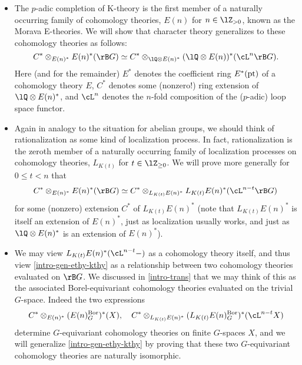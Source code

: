 \begin{itemize}[leftmargin=*]
\item The $p$-adic completion of K-theory is the first member of a
  naturally occurring family of cohomology theories, $E(n)$ for
  $n \in \lZ_{> 0}$, known as the Morava E-theories. We will show that
  character theory generalizes to these cohomology theories as
  follows:
  \begin{equation}
    \label{intro-gen-ethy}
    C^* \otimes_{E(n)^*} E(n)^*(\rB G) \iso
    C^* \otimes_{\lQ \otimes E(n)^*}
    (\lQ \otimes E(n))^*(\cL^n\rB G).
  \end{equation}
  Here (and for the remainder) $E^*$ denotes the coefficient ring
  $E^*(\mathrm{pt})$ of a cohomology theory $E$, $C^*$ denotes some (nonzero!)
  ring extension of $\lQ \otimes E(n)^*$, and $\cL^n$ denotes the
  $n$-fold composition of the ($p$-adic) loop space functor.

\item Again in analogy to the situation for abelian groups, we should
  think of rationalization as some kind of localization process. In
  fact, rationalization is the zeroth member of a naturally occurring
  family of localization processes on cohomology theories, $L_{K(t)}$
  for $t \in \lZ_{\ge 0}$. We will prove more generally for
  $0 \le t < n$ that
  \begin{equation}
    \label{intro-gen-ethy-kthy}
    C^* \otimes_{E(n)^*} E(n)^*(\rB G) \iso
    C^* \otimes_{L_{K(t)}E(n)^*}
    L_{K(t)}E(n)^*(\cL^{n-t}\rB G)
  \end{equation}
  for some (nonzero) extension $C^*$ of $L_{K(t)}E(n)^*$ (note that
  $L_{K(t)}E(n)^*$ is itself an extension of $E(n)^*$, just as
  localization usually works, and just as $\lQ \otimes E(n)^*$ is an
  extension of $E(n)^*$).

\item We may view $L_{K(t)}E(n)^*(\cL^{n-t}-)$ as a cohomology theory
  itself, and thus view \cref{intro-gen-ethy-kthy} as a relationship
  between two cohomology theories evaluated on $\rB G$. We discussed
  in \cref{intro-trans} that we may think of this as the associated
  Borel-equivariant cohomology theories evaluated on the trivial
  $G$-space. Indeed the two expressions
  \[
  C^* \otimes_{E(n)^*} (E(n)^\Bor_G)^*(X), \quad
  C^* \otimes_{L_{K(t)}E(n)^*}
  (L_{K(t)}E(n)^\Bor_G)^*(\cL^{n-t}X)
  \]
  determine $G$-equivariant cohomology theories on finite $G$-spaces
  $X$, and we will generalize \cref{intro-gen-ethy-kthy} by proving
  that these two $G$-equivariant cohomology theories are naturally
  isomorphic.


\end{itemize}
